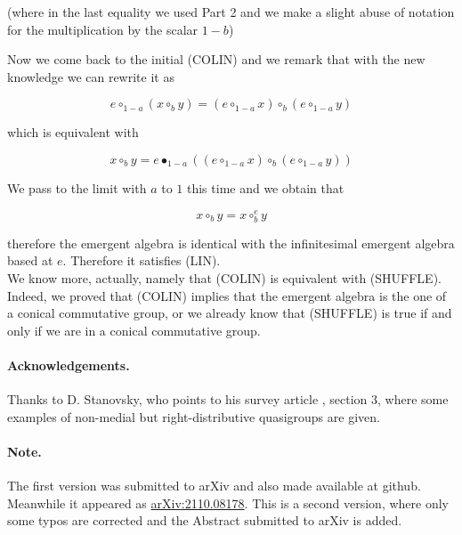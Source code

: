 \documentclass{article}
\begin{document}
(where in the last equality we used Part 2 and we make a slight abuse of notation for the multiplication by the scalar $1-b$)



Now we come back to the initial (COLIN) and we remark that with the new knowledge we can rewrite it as 



$$ e \circ_{1-a} (x \circ_{b} y) = (e \circ_{1-a} x ) \circ_{b} ( e \circ_{1-a} y)$$



which is equivalent with 



$$ x \circ_{b} y = e \bullet_{1-a} ((e \circ_{1-a} x ) \circ_{b} ( e \circ_{1-a} y))$$



We pass to the limit with $a$ to $1$ this time and we obtain that 



$$ x \circ_{b} y = x \circ_{b}^{e} y$$



therefore the emergent algebra is identical with the infinitesimal emergent algebra based at $e$. Therefore it satisfies (LIN). \\







We know more, actually, namely that (COLIN) is equivalent with (SHUFFLE). Indeed, we proved that (COLIN) implies that the emergent algebra is the one of a conical commutative group, or we already know that (SHUFFLE) is true if and only if we are in a conical commutative group. 



\paragraph{Acknowledgements.} Thanks to D. Stanovsky, who points to his survey article \cite{stanovsky}, section 3, where some examples of non-medial but right-distributive quasigroups are given. 

\paragraph{Note.} The first version was submitted to arXiv and also made available at github. Meanwhile it appeared as \href{https://arxiv.org/abs/2110.08178}{arXiv:2110.08178}. This is a second version, where only some typos are corrected and the Abstract submitted to arXiv is added. 
\end{document}

